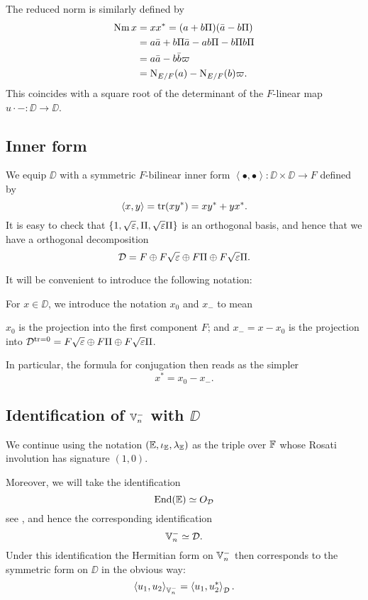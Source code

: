 The reduced norm is similarly defined by
\begin{align*}
  \operatorname{Nm} x &= x x^\ast = (a + b \Pi)(\bar a - b \Pi) \\
  &= a \bar a + b \Pi \bar a - a b \Pi - b \Pi b \Pi \\
  &= a \bar a - b \bar b \varpi \\
  &= \operatorname{N}_{E/F}(a) - \operatorname{N}_{E/F}(b) \varpi .
\end{align*}
This coincides with a square root of
the determinant of the $F$-linear map $u \cdot - \colon \DD \to \DD$.

\subsection{Inner form}
We equip $\DD$ with a symmetric $F$-bilinear inner form
$\left\langle \bullet, \bullet \right\rangle \colon \DD \times \DD \to F$ defined by
\[ \left\langle x,y \right\rangle = \operatorname{tr}(xy^\ast) = xy^\ast + yx^\ast. \]
It is easy to check that $\{1, \sqrt{\varepsilon}, \Pi, \sqrt{\varepsilon}\Pi\}$ is an orthogonal basis,
and hence that we have a orthogonal decomposition
\[ \mathcal D = F \oplus F\sqrt{\varepsilon} \oplus F \Pi \oplus F\sqrt{\varepsilon}\Pi. \]

It will be convenient to introduce the following notation:
\begin{definition}
  For $x \in \DD$, we introduce the notation $x_0$ and $x_-$ to mean
  \begin{itemize}
    \ii $x_0$ is the projection into the first component $F$; and
    \ii $x_- = x - x_0$ is the projection into
    $\mathcal D^{\operatorname{tr} = 0} = F\sqrt{\varepsilon} \oplus F \Pi \oplus F\sqrt{\varepsilon}\Pi$.
  \end{itemize}
\end{definition}
In particular, the formula for conjugation then reads as the simpler
\[ x^\ast = x_0 - x_-. \]

\subsection{Identification of $\mathbb V_n^-$ with $\DD$}
We continue using the notation $(\mathbb E, \iota_\mathbb E, \lambda_\mathbb E)$ as the triple over $\mathbb F$
whose Rosati involution has signature $(1,0)$.

Moreover, we will take the identification
\[ \operatorname{End}(\mathbb E) \simeq O_\mathcal D \]
see \cite[Remark 2.5]{ref:KR},
and hence the corresponding identification
\[ \mathbb V_n^- \simeq \mathcal D. \]
Under this identification
the Hermitian form on $\mathbb V_n^-$ then corresponds to the
symmetric form on $\DD$ in the obvious way:
\[ \left\langle u_1, u_2 \right\rangle_{\mathbb V_n^-}
  = \left\langle u_1, u_2^\ast \right\rangle_{\mathcal D}. \]

